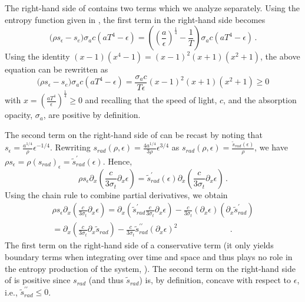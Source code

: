 \documentclass[times,doublespace]{fldauth}%
\begin{document}
The right-hand side of  contains two terms which we analyze separately. 
Using the entropy function given in , the first term in the right-hand side becomes
%
\begin{equation} 
\Big( \rho s_\epsilon -s_e \Big)  \sigma_a c \left( a T^4 - \epsilon \right) 
= \left( \left( \frac{a}{\epsilon}\right)^\frac{1}{4} - \frac{1}{T} \right)   \sigma_a c \left( a T^4 - \epsilon \right) \,.
\end{equation}
Using the identity $(x-1)(x^4-1) = (x-1)^2(x+1)(x^2+1)$, the above equation can be rewritten as
\begin{equation} 
\Big( \rho s_\epsilon -s_e \Big)  \sigma_a c \left( a T^4 - \epsilon \right) 
= \frac{\sigma_a c}{T \epsilon}  (x-1)^2(x+1)(x^2+1) \geq 0
\end{equation}
%
with $x=  \left(\frac{aT^4}{\epsilon}\right)^\frac{1}{4} \geq 0$ and recalling that the speed of light, $c$,
and the absorption opacity, $\sigma_a$, are positive by definition. 

The second term on the right-hand side of  can be recast by noting that $s_\epsilon = 
\frac{a^{1/4}}{\rho} \epsilon^{-1/4}$. Rewriting $s_{rad}(\rho, \epsilon) = \frac{4a^{1/4}}{3\rho} \epsilon^{3/4}$ 
as  $s_{rad}(\rho, \epsilon) = \frac{\tilde{s}_{rad}(\epsilon)}{\rho}$, we have
$ \rho s_\epsilon = \rho (s_{rad})_\epsilon = \tilde{s}^\prime_{rad}(\epsilon)$. Hence, 
\begin{equation}
\rho s_\epsilon \partial_x \left( \frac{c}{3 \sigma_t} \partial_x \epsilon \right) 
=
 \tilde{s}^\prime_{rad}(\epsilon) \partial_x \left( \frac{c}{3 \sigma_t} \partial_x \epsilon \right)  \,.
\end{equation}
%
Using the chain rule to combine partial derivatives, we obtain
%
\begin{multline} \label{eq:final_form_second_term}
\rho s_\epsilon \partial_x \left( \frac{c}{3 \sigma_t} \partial_x \epsilon \right) 
=
 \partial_x \left(  \tilde{s}^\prime_{rad}  \frac{c}{3 \sigma_t} \partial_x \epsilon \right) 
-
\frac{c}{3 \sigma_t} \left(  \partial_x \epsilon \right)  \left( \partial_x \tilde{s}^\prime_{rad}  \right) \\
=
 \partial_x \left(   \frac{c}{3 \sigma_t} \partial_x \tilde{s}_{rad}  \right) 
-
\frac{c}{3 \sigma_t} \tilde{s}^{\prime\prime}_{rad}  \left(  \partial_x \epsilon \right)^2   \qquad  \qquad  \qquad \  \,.
\end{multline}
%
The first term on the right-hand side of  a conservative term (it only yields boundary 
terms when integrating over time and space and thus plays no role in the entropy production of the system, 
\cite{Leveque}). The second term on the right-hand side of  is positive 
since $s_{rad}$ (and thus $\tilde{s}_{rad}$) is, by definition, concave with respect to $\epsilon$, i.e., $\tilde{s}^{\prime\prime}_{rad} \leq 0$.
\end{document}
